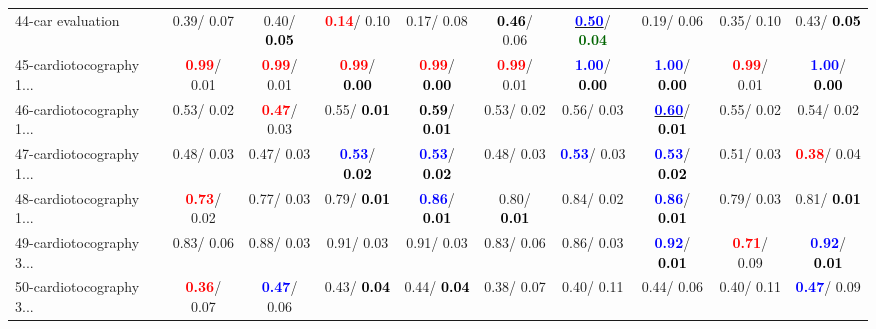 \begin{table}[h]
\begin{center}
{\begin{tabular}{lc|c|c|c|c|c|c|c|c}
44-car evaluation &   0.39/  0.07 &   0.40/\textcolor{black}{\textbf{  0.05}} & \textcolor{red}{\textbf{  0.14}}/  0.10 &   0.17/  0.08 & \textcolor{black}{\textbf{  0.46}}/  0.06 & \underline{\textcolor{blue}{\textbf{  0.50}}}/\textcolor{darkgreen}{\textbf{  0.04}} &   0.19/  0.06 &   0.35/  0.10 &   0.43/\textcolor{black}{\textbf{  0.05}} \\
45-cardiotocography 1... & \textcolor{red}{\textbf{  0.99}}/  0.01 & \textcolor{red}{\textbf{  0.99}}/  0.01 & \textcolor{red}{\textbf{  0.99}}/\textcolor{black}{\textbf{  0.00}} & \textcolor{red}{\textbf{  0.99}}/\textcolor{black}{\textbf{  0.00}} & \textcolor{red}{\textbf{  0.99}}/  0.01 & \textcolor{blue}{\textbf{  1.00}}/\textcolor{black}{\textbf{  0.00}} & \textcolor{blue}{\textbf{  1.00}}/\textcolor{black}{\textbf{  0.00}} & \textcolor{red}{\textbf{  0.99}}/  0.01 & \textcolor{blue}{\textbf{  1.00}}/\textcolor{black}{\textbf{  0.00}} \\
46-cardiotocography 1... &   0.53/  0.02 & \textcolor{red}{\textbf{  0.47}}/  0.03 &   0.55/\textcolor{black}{\textbf{  0.01}} & \textcolor{black}{\textbf{  0.59}}/\textcolor{black}{\textbf{  0.01}} &   0.53/  0.02 &   0.56/  0.03 & \underline{\textcolor{blue}{\textbf{  0.60}}}/\textcolor{black}{\textbf{  0.01}} &   0.55/  0.02 &   0.54/  0.02 \\ \hline
47-cardiotocography 1... &   0.48/  0.03 &   0.47/  0.03 & \textcolor{blue}{\textbf{  0.53}}/\textcolor{black}{\textbf{  0.02}} & \textcolor{blue}{\textbf{  0.53}}/\textcolor{black}{\textbf{  0.02}} &   0.48/  0.03 & \textcolor{blue}{\textbf{  0.53}}/  0.03 & \textcolor{blue}{\textbf{  0.53}}/\textcolor{black}{\textbf{  0.02}} &   0.51/  0.03 & \textcolor{red}{\textbf{  0.38}}/  0.04 \\
48-cardiotocography 1... & \textcolor{red}{\textbf{  0.73}}/  0.02 &   0.77/  0.03 &   0.79/\textcolor{black}{\textbf{  0.01}} & \textcolor{blue}{\textbf{  0.86}}/\textcolor{black}{\textbf{  0.01}} &   0.80/\textcolor{black}{\textbf{  0.01}} &   0.84/  0.02 & \textcolor{blue}{\textbf{  0.86}}/\textcolor{black}{\textbf{  0.01}} &   0.79/  0.03 &   0.81/\textcolor{black}{\textbf{  0.01}} \\
49-cardiotocography 3... &   0.83/  0.06 &   0.88/  0.03 &   0.91/  0.03 &   0.91/  0.03 &   0.83/  0.06 &   0.86/  0.03 & \textcolor{blue}{\textbf{  0.92}}/\textcolor{black}{\textbf{  0.01}} & \textcolor{red}{\textbf{  0.71}}/  0.09 & \textcolor{blue}{\textbf{  0.92}}/\textcolor{black}{\textbf{  0.01}} \\
50-cardiotocography 3... & \textcolor{red}{\textbf{  0.36}}/  0.07 & \textcolor{blue}{\textbf{  0.47}}/  0.06 &   0.43/\textcolor{black}{\textbf{  0.04}} &   0.44/\textcolor{black}{\textbf{  0.04}} &   0.38/  0.07 &   0.40/  0.11 &   0.44/  0.06 &   0.40/  0.11 & \textcolor{blue}{\textbf{  0.47}}/  0.09 \\

\end{tabular}}
\end{center}
\end{table}
